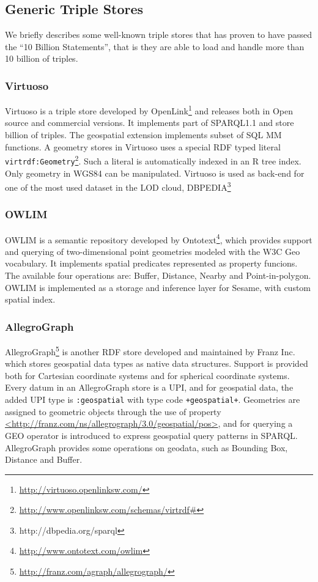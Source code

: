 \subsection{Generic Triple Stores}
\label{sec:genrictps}

We briefly describes some well-known triple stores that has proven to have passed the ``10 Billion Statements'', that is they are able to load and handle more than 10 billion of triples.
\subsubsection{Virtuoso}
Virtuoso is a triple store developed by OpenLink\footnote{\url{http://virtuoso.openlinksw.com/}} and releases both in Open source and commercial versions. It implements part of SPARQL1.1 and store billion of triples. The geospatial extension implements subset of SQL MM functions. A geometry stores in Virtuoso uses a special RDF typed literal \texttt{virtrdf:Geometry}\footnote{\url{http://www.openlinksw.com/schemas/virtrdf\#}}. Such a literal is automatically indexed in an R tree index. Only geometry in WGS84 can be manipulated. Virtuoso is used as back-end for one of the most used dataset in the LOD cloud, \textsc{DBPEDIA}\footnote{http://dbpedia.org/sparql}


\subsubsection{OWLIM}
OWLIM is a semantic repository developed by Ontotext\footnote{\url{http://www.ontotext.com/owlim}}, which provides support and querying of
two-dimensional point geometries modeled with the W3C Geo vocabulary. It implements spatial predicates represented as property funcions. The available four operations are: Buffer, Distance, Nearby and Point-in-polygon. OWLIM is implemented as a storage and inference layer for Sesame, with custom spatial index.

\subsubsection{AllegroGraph}
AllegroGraph\footnote{\url{http://franz.com/agraph/allegrograph/}} is another RDF store developed and maintained by Franz Inc. which stores geospatial data types as native data structures. Support is provided both for Cartesian coordinate systems and for spherical coordinate systems. Every datum in an AllegroGraph store is a UPI, and for geospatial data, the added UPI type is \texttt{:geospatial} with type code \texttt{+geospatial+}. Geometries are assigned to geometric objects through the use of property \url{<http://franz.com/ns/allegrograph/3.0/geospatial/pos>}, and for querying a GEO operator is introduced to express geospatial query patterns in SPARQL. AllegroGraph provides some operations on geodata, such as Bounding Box, Distance and Buffer.




